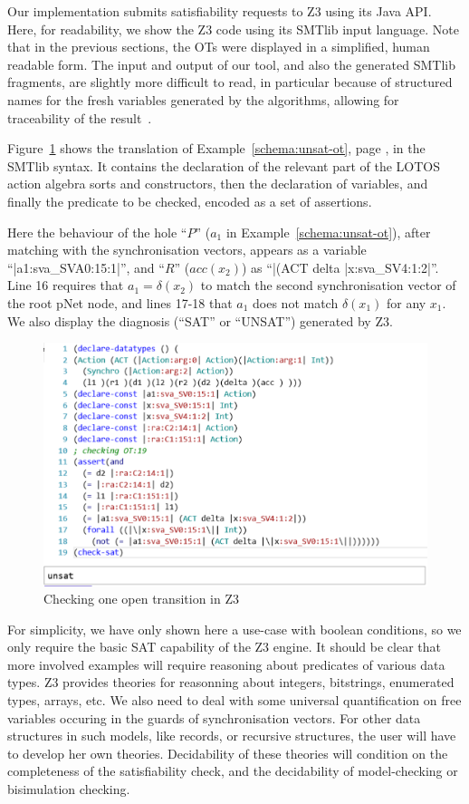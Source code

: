 \documentclass[smallcondensed]{svjour3}
\begin{document}
Our implementation submits satisfiability requests to
Z3 using its Java API. Here, for readability, we
show the Z3 code using its SMTlib input language.
Note that in the previous sections, the OTs were displayed in a
simplified, human readable form. The input and output of our tool, and
also the generated SMTlib fragments, are
slightly more difficult to read, in 
particular because of structured names for the fresh variables generated
by the algorithms, allowing for traceability of the result~\cite{Avocs-RR}.

Figure~\ref{schema:smt-lib} shows the translation of  Example~\ref{schema:unsat-ot}, page \pageref{schema:unsat-ot},
in the SMTlib syntax. It contains the declaration
of the relevant part of the LOTOS action algebra sorts 
and constructors, then the declaration of variables, and finally the
predicate to be checked, encoded as a set of assertions.

Here the behaviour of the hole ``$P$'' ($a_1$ in Example~\ref{schema:unsat-ot}), after matching with the synchronisation vectors, appears as a variable
``|a1:sva\_SVA0:15:1|'', and ``$R$'' ($acc(x_2)$) as ``|(ACT delta
|x:sva\_SV4:1:2|''. Line 16 requires that $a_1 = \delta(x_2)$ to match
the second synchronisation vector of the root pNet node, and lines
17-18 that $a_1$ does not match $\delta(x_1)$ for any $x_1$. 
We also display  the diagnosis (``SAT'' or ``UNSAT'') generated by Z3.

\begin{figure}[t]
    \centerline{\includegraphics[width=0.8\linewidth]{ActaXFIG/rise4fun1}}
  \caption{Checking one open transition in Z3}  \label{schema:smt-lib}
\end{figure}

For simplicity, we have only shown here a use-case with boolean conditions, so we only require the basic SAT capability of the Z3
engine. It should be clear that more involved examples will require
reasoning about predicates of various data types. Z3 provides theories for reasonning
about integers, bitstrings, enumerated types, arrays, etc.
We also need to deal with some universal quantification on free
variables occuring in the guards of synchronisation vectors.
For other data structures  in such models, like records, or
recursive structures, the user will have to develop her own theories.
Decidability of these theories will condition on the completeness of the
satisfiability check, and the decidability of model-checking or
bisimulation checking.
\end{document}
